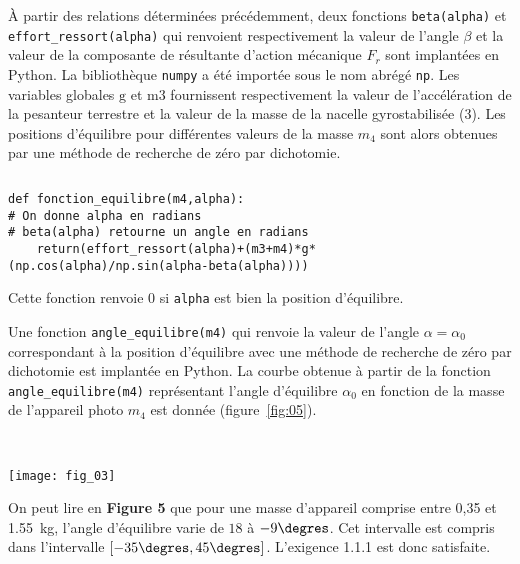 \ifprof
\else
À partir des relations déterminées précédemment, deux fonctions \texttt{beta(alpha)} et \texttt{effort\_ressort(alpha)} qui renvoient respectivement la valeur de l'angle $\beta$ et la valeur de la composante de résultante d'action mécanique $F_{r}$ sont implantées en Python. La bibliothèque \texttt{numpy} a été importée sous le nom abrégé \texttt{np}. Les variables globales $\mathrm{g}$ et $\mathrm{m} 3$ fournissent respectivement la valeur de l'accélération de la pesanteur terrestre et la valeur de la masse de la nacelle gyrostabilisée (3). Les positions d'équilibre pour différentes valeurs de la masse $m_{4}$ sont alors obtenues par une méthode de recherche de zéro par dichotomie.
\fi

\ifprof
\begin{corrige} $\quad$
\begin{lstlisting}
def fonction_equilibre(m4,alpha):
# On donne alpha en radians
# beta(alpha) retourne un angle en radians
    return(effort_ressort(alpha)+(m3+m4)*g*(np.cos(alpha)/np.sin(alpha-beta(alpha))))
\end{lstlisting}

Cette fonction renvoie 0 si \texttt{alpha} est bien la position d'équilibre.

\end{corrige}
\else
\fi

\ifprof
\else
Une fonction \texttt{angle\_equilibre(m4)} qui renvoie la valeur de l'angle $\alpha=\alpha_{0}$ correspondant à la position d'équilibre avec une méthode de recherche de zéro par dichotomie est implantée en Python. La courbe obtenue à partir de la fonction \texttt{angle\_equilibre(m4)} représentant l'angle d'équilibre $\alpha_{0}$ en fonction de la masse de l'appareil photo $m_{4}$ est donnée (figure~\ref{fig:05}).
\fi

\ifprof
\begin{corrige} ~\\ $\quad$
\begin{center}
\texttt{[image: fig\_03]}
\end{center}

On peut lire en \textbf{Figure 5} que pour une masse d'appareil comprise entre 0,35 et \SI{1,55}{kg}, l'angle d'équilibre varie de $18$ à $-9\degres$. Cet intervalle est compris dans l'intervalle $\left[-35\degres,45\degres\right]$. L'exigence 1.1.1 est donc satisfaite.
\end{corrige}
\else
\fi

